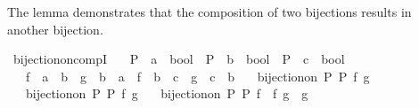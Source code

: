 \begin{isabellebody}
\endisatagproof
{\isafoldproof}%
%
\isadelimproof
%
\endisadelimproof
%
\begin{isamarkuptext}%
The lemma demonstrates that the composition of two bijections results in another bijection.%
\end{isamarkuptext}\isamarkuptrue%
\isamarkupfalse%
\ bijection{\isacharunderscore}{\kern0pt}on{\isacharunderscore}{\kern0pt}compI{\isacharcolon}{\kern0pt}\isanewline
\ \ \ P\ {\isacharcolon}{\kern0pt}{\isacharcolon}{\kern0pt}\ {\isachardoublequoteopen}{\isacharprime}{\kern0pt}a\ {\isasymRightarrow}\ bool{\isachardoublequoteclose}\ \ P{\isacharprime}{\kern0pt}\ {\isacharcolon}{\kern0pt}{\isacharcolon}{\kern0pt}\ {\isachardoublequoteopen}{\isacharprime}{\kern0pt}b\ {\isasymRightarrow}\ bool{\isachardoublequoteclose}\ \ P{\isacharprime}{\kern0pt}{\isacharprime}{\kern0pt}\ {\isacharcolon}{\kern0pt}{\isacharcolon}{\kern0pt}\ {\isachardoublequoteopen}{\isacharprime}{\kern0pt}c\ {\isasymRightarrow}\ bool{\isachardoublequoteclose}\isanewline
\ \ \ f\ {\isacharcolon}{\kern0pt}{\isacharcolon}{\kern0pt}\ {\isachardoublequoteopen}{\isacharprime}{\kern0pt}a\ {\isasymRightarrow}\ {\isacharprime}{\kern0pt}b{\isachardoublequoteclose}\ \ g\ {\isacharcolon}{\kern0pt}{\isacharcolon}{\kern0pt}\ {\isachardoublequoteopen}{\isacharprime}{\kern0pt}b\ {\isasymRightarrow}\ {\isacharprime}{\kern0pt}a{\isachardoublequoteclose}\ \ f{\isacharprime}{\kern0pt}\ {\isacharcolon}{\kern0pt}{\isacharcolon}{\kern0pt}\ {\isachardoublequoteopen}{\isacharprime}{\kern0pt}b\ {\isasymRightarrow}\ {\isacharprime}{\kern0pt}c{\isachardoublequoteclose}\ \ g{\isacharprime}{\kern0pt}\ {\isacharcolon}{\kern0pt}{\isacharcolon}{\kern0pt}\ {\isachardoublequoteopen}{\isacharprime}{\kern0pt}c\ {\isasymRightarrow}\ {\isacharprime}{\kern0pt}b{\isachardoublequoteclose}\isanewline
\ \ \ {\isachardoublequoteopen}bijection{\isacharunderscore}{\kern0pt}on\ P\ P{\isacharprime}{\kern0pt}\ f\ g{\isachardoublequoteclose}\isanewline
\ \ \ {\isachardoublequoteopen}bijection{\isacharunderscore}{\kern0pt}on\ P{\isacharprime}{\kern0pt}\ P{\isacharprime}{\kern0pt}{\isacharprime}{\kern0pt}\ f{\isacharprime}{\kern0pt}\ g{\isacharprime}{\kern0pt}{\isachardoublequoteclose}\isanewline
\ \ \ {\isachardoublequoteopen}bijection{\isacharunderscore}{\kern0pt}on\ P\ P{\isacharprime}{\kern0pt}{\isacharprime}{\kern0pt}\ {\isacharparenleft}{\kern0pt}f{\isacharprime}{\kern0pt}\ {\isasymcirc}\ f{\isacharparenright}{\kern0pt}\ {\isacharparenleft}{\kern0pt}g\ {\isasymcirc}\ g{\isacharprime}{\kern0pt}{\isacharparenright}{\kern0pt}{\isachardoublequoteclose}\isanewline

\end{isabellebody}
